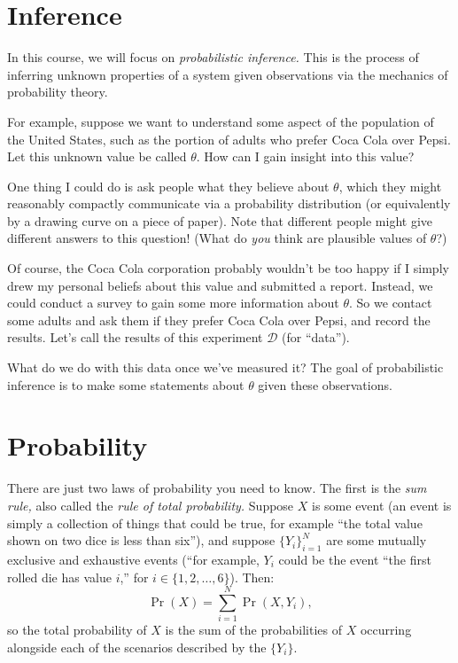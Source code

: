 \documentclass{article}
\newcommand{\mc}[1]{\mathcal{#1}}
\newcommand{\data}{\mc{D}}
\begin{document}
\section*{Inference}

In this course, we will focus on \emph{probabilistic inference.}  This
is the process of inferring unknown properties of a system given
observations via the mechanics of probability theory.

For example, suppose we want to understand some aspect of the
population of the United States, such as the portion of adults who
prefer Coca Cola over Pepsi.  Let this unknown value be called
$\theta$.  How can I gain insight into this value?

One thing I could do is ask people what they believe about $\theta$,
which they might reasonably compactly communicate via a probability
distribution (or equivalently by a drawing curve on a piece of paper).
Note that different people might give different answers to this
question!  (What do \emph{you} think are plausible values of
$\theta$?)

Of course, the Coca Cola corporation probably wouldn't be too happy if
I simply drew my personal beliefs about this value and submitted a
report.  Instead, we could conduct a survey to gain some more
information about $\theta$.  So we contact some adults and ask them if
they prefer Coca Cola over Pepsi, and record the results.  Let's call
the results of this experiment $\data$ (for ``data'').

What do we do with this data once we've measured it?  The goal of
probabilistic inference is to make some statements about $\theta$
given these observations.

\section*{Probability}

There are just two laws of probability you need to know.  The first is
the \emph{sum rule,} also called the \emph{rule of total probability.}
Suppose $X$ is some event (an event is simply a collection of things
that could be true, for example ``the total value shown on two dice is
less than six''), and suppose $\{Y_i\}_{i = 1}^N$ are some mutually
exclusive and exhaustive events (``for example, $Y_i$ could be the
event ``the first rolled die has value $i$,'' for $i \in \{1, 2,
\dotsc, 6\}$).  Then:
\begin{equation*}
  \Pr(X) = \sum_{i = 1}^N \Pr(X, Y_i),
\end{equation*}
so the total probability of $X$ is the sum of the probabilities of $X$
occurring alongside each of the scenarios described by the $\{Y_i\}$.
\end{document}
